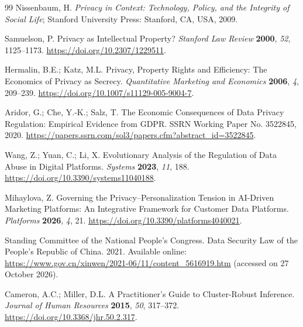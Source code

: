 \begin{thebibliography}{99}
Nissenbaum, H. \textit{Privacy in Context: Technology, Policy, and the Integrity of Social Life}; Stanford University Press: Stanford, CA, USA, 2009.

Samuelson, P. Privacy as Intellectual Property? \textit{Stanford Law Review} \textbf{2000}, \textit{52}, 1125--1173. \url{https://doi.org/10.2307/1229511}.

Hermalin, B.E.; Katz, M.L. Privacy, Property Rights and Efficiency: The Economics of Privacy as Secrecy. \textit{Quantitative Marketing and Economics} \textbf{2006}, \textit{4}, 209--239. \url{https://doi.org/10.1007/s11129-005-9004-7}.

Aridor, G.; Che, Y.-K.; Salz, T. The Economic Consequences of Data Privacy Regulation: Empirical Evidence from GDPR. SSRN Working Paper No. 3522845, 2020. \url{https://papers.ssrn.com/sol3/papers.cfm?abstract_id=3522845}.

Wang, Z.; Yuan, C.; Li, X. Evolutionary Analysis of the Regulation of Data Abuse in Digital Platforms. \textit{Systems} \textbf{2023}, \textit{11}, 188. \url{https://doi.org/10.3390/systems11040188}.

Mihaylova, Z. Governing the Privacy--Personalization Tension in AI-Driven Marketing Platforms: An Integrative Framework for Customer Data Platforms. \textit{Platforms} \textbf{2026}, \textit{4}, 21. \url{https://doi.org/10.3390/platforms4040021}.

Standing Committee of the National People's Congress. Data Security Law of the People's Republic of China. 2021. Available online: \url{https://www.gov.cn/xinwen/2021-06/11/content_5616919.htm} (accessed on 27 October 2026).

Cameron, A.C.; Miller, D.L. A Practitioner's Guide to Cluster-Robust Inference. \textit{Journal of Human Resources} \textbf{2015}, \textit{50}, 317--372. \url{https://doi.org/10.3368/jhr.50.2.317}.

\end{thebibliography}